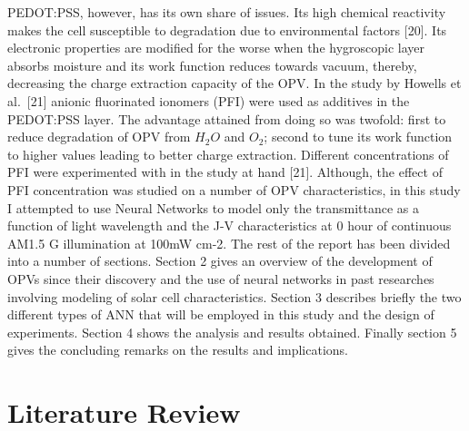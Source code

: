 \documentclass[]{article}
\begin{document}
PEDOT:PSS, however, has its own share of issues. Its high chemical reactivity makes the cell susceptible to degradation due to environmental factors {[}20{]}. Its electronic properties are modified for the worse when the hygroscopic layer absorbs moisture and its work function reduces towards vacuum, thereby, decreasing the charge extraction capacity of the OPV. In the study by Howells et al.~{[}21{]} anionic fluorinated ionomers (PFI) were used as additives in the PEDOT:PSS layer. The advantage attained from doing so was twofold: first to reduce degradation of OPV from \(H_2O\) and \(O_2\); second to tune its work function to higher values leading to better charge extraction. Different concentrations of PFI were experimented with in the study at hand {[}21{]}. Although, the effect of PFI concentration was studied on a number of OPV characteristics, in this study I attempted to use Neural Networks to model only the transmittance as a function of light wavelength and the J-V characteristics at 0 hour of continuous AM1.5 G illumination at 100mW cm-2.
The rest of the report has been divided into a number of sections. Section 2 gives an overview of the development of OPVs since their discovery and the use of neural networks in past researches involving modeling of solar cell characteristics. Section 3 describes briefly the two different types of ANN that will be employed in this study and the design of experiments. Section 4 shows the analysis and results obtained. Finally section 5 gives the concluding remarks on the results and implications.

\hypertarget{literature-review}{%
\section{Literature Review}\label{literature-review}}
\end{document}
